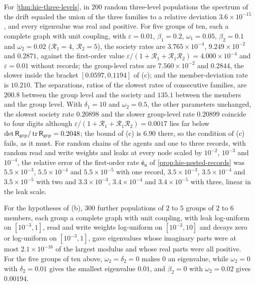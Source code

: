 \begin{numcheck}\label{chk:hie-three}
For \cref{thm:hie-three-levels}, in $200$ random three-level populations the spectrum of the drift equaled the union of the three families to a relative deviation $3.6\times10^{-15}$, and every eigenvalue was real and positive. For five groups of ten, each a complete graph with unit coupling, with $\varepsilon=0.01$, $\beta_1=0.2$, $\omega_1=0.05$, $\beta_2=0.1$ and $\omega_2=0.02$ ($\mathcal R_1=4$, $\mathcal R_2=5$), the society rates are $3.765\times10^{-4}$, $9.249\times10^{-2}$ and $0.2871$, against the first-order value $\varepsilon/(1+\mathcal R_1+\mathcal R_1\mathcal R_2)=4.000\times10^{-4}$ and $\varepsilon=0.01$ without records; the group-level rates are $7.560\times10^{-2}$ and $0.2844$, the slower inside the bracket $[0.0597,0.1194]$ of (c); and the member-deviation rate is $10.210$. The separations, ratios of the slowest rates of consecutive families, are $200.8$ between the group level and the society and $135.1$ between the members and the group level. With $\delta_1=10$ and $\omega_2=0.5$, the other parameters unchanged, the slowest society rate $0.20898$ and the slower group-level rate $0.20899$ coincide to four digits although $\varepsilon/(1+\mathcal R_1+\mathcal R_1\mathcal R_2)=0.0017$ lies far below $\det\mathsf R_{\mathrm{grp}}/\operatorname{tr}\mathsf R_{\mathrm{grp}}=0.2048$; the bound of (c) is $6.90$ there, so the condition of (c) fails, as it must. For random chains of the agents and one to three records, with random read and write weights and leaks at every node scaled by $10^{-2}$, $10^{-3}$ and $10^{-4}$, the relative error of the first-order rate $\bar{\mathsf e}_{\mathsf u}$ of \cref{prop:hie-nested-records} was $5.5\times10^{-3}$, $5.5\times10^{-4}$ and $5.5\times10^{-5}$ with one record, $3.5\times10^{-3}$, $3.5\times10^{-4}$ and $3.5\times10^{-5}$ with two and $3.3\times10^{-3}$, $3.4\times10^{-4}$ and $3.4\times10^{-5}$ with three, linear in the leak scale.

For the hypotheses of (b), $300$ further populations of $2$ to $5$ groups of $2$ to $6$ members, each group a complete graph with unit coupling, with leak log-uniform on $[10^{-3},1]$, read and write weights log-uniform on $[10^{-3},10]$ and decays zero or log-uniform on $[10^{-3},1]$, gave eigenvalues whose imaginary parts were at most $2.1\times10^{-16}$ of the largest modulus and whose real parts were all positive. For the five groups of ten above, $\omega_2=\delta_2=0$ makes $0$ an eigenvalue, while $\omega_2=0$ with $\delta_2=0.01$ gives the smallest eigenvalue $0.01$, and $\beta_2=0$ with $\omega_2=0.02$ gives $0.00194$.
\end{numcheck}
